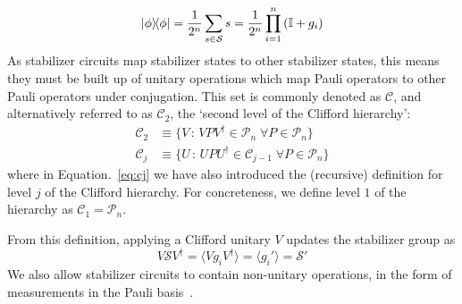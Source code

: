 \begin{equation}
    \ketbra{\phi} = \frac{1}{2^{n}}\sum_{s\in\mathcal{S}} s = \frac{1}{2^{n}}\prod_{i=1}^{n}\left(\mathbb{I}+g_{i}\right)
\end{equation}
As stabilizer circuits map stabilizer states to other stabilizer states, this means they must be built up of unitary operations which map Pauli operators to other Pauli operators under conjugation. This set is commonly denoted as $\mathcal{C}$, and alternatively referred to as $\mathcal{C}_{2}$, the `second level of the Clifford hierarchy':
\begin{align}
    \mathcal{C}_{2} &\equiv \{V\,:\,VPV^{\dagger}\in\mathcal{P}_{n}\;\forall P\in\mathcal{P}_{n}\} \label{eq:c2}\\
    \mathcal{C}_{j} &\equiv \{U\,:\,UPU^{\dagger}\in\mathcal{C}_{j-1}\;\forall P\in\mathcal{P}_{n}\} \label{eq:cj}
\end{align}
where in Equation.~\ref{eq:cj} we have also introduced the (recursive) definition for level $j$ of the Clifford hierarchy. For concreteness, we define level $1$ of the hierarchy as $\mathcal{C}_{1}=\mathcal{P}_{n}$.\par
From this definition, applying a Clifford unitary $V$ updates the stabilizer group as
\begin{equation}
    V\mathcal{S}V^{\dagger}=\langle Vg_{i}V^{\dagger}\rangle = \langle g_{i}' \rangle = \mathcal{S}'
\end{equation}
We also allow stabilizer circuits to contain non-unitary operations, in the form of measurements in the Pauli basis~\cite{Gottesman1998b}.
